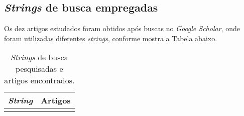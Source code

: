 \begin{anexosenv}
\chapter{\textit{Strings} de busca empregadas} \label{anex:anexo1}

Os dez artigos estudados foram obtidos após buscas no \textit{Google Scholar}, onde foram utilizadas diferentes \textit{strings}, conforme mostra a Tabela abaixo. 

\begin{center}
\begin{longtable}{ll}
\caption{\textit{Strings} de busca pesquisadas e artigos encontrados.}\\
\hline
\multicolumn{1}{c}{\textit{String}} & \multicolumn{1}{c}{Artigos} \\ \hline
\endfirsthead

\endhead

\endfoot

\endlastfoot


\end{longtable}
\end{center}
\end{anexosenv}
